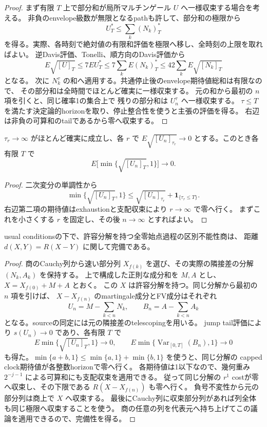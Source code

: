 \begin{proof}
まず有限 $T$ 上で部分和が局所マルチンゲール $U$ へ一様収束する場合を考える。
非負のenvelope級数が無限となるpathも許して、部分和の極限から
\[
 U_T^*\le\sum_k (N_k)_T^*
\]
を得る。実際、各時刻で絶対値の有限和評価を極限へ移し、全時刻の上限を取ればよい。
逆Davis評価、Tonelli、順方向のDavis評価から
\[
 E\sqrt{[U]_T}\le7E U_T^*
 \le7\sum_k E(N_k)_T^*\le42\sum_k E\sqrt{[N_k]_T}
\]
となる。
次に $N_k^\tau$ の和へ適用する。共通停止後のenvelope期待値総和は有限なので、
その部分和は全時間でほとんど確実に一様収束する。
元の和から最初の $n$ 項を引くと、同じ確率1の集合上で
残りの部分和は $U_n^\tau$ へ一様収束する。
$\tau\le T$ を満たす決定論的horizonを取り、停止整合性を使うと主張の評価を得る。
右辺は非負の可算和のtailであるから零へ収束する。
\end{proof}

\begin{lemma}
$\tau_r\to\infty$ がほとんど確実に成立し、各 $r$ で
$E\sqrt{[U_n]_{\tau_r}}\to0$ とする。このとき各有限 $T$ で
\[
 E\bigl[\min\{\sqrt{[U_n]_T},1\}\bigr]\longrightarrow0.
\]
\end{lemma}
\begin{proof}
二次変分の単調性から
\[
 \min\{\sqrt{[U_n]_T},1\}
 \le\sqrt{[U_n]_{\tau_r}}+\boldsymbol1_{\{\tau_r\le T\}}.
\]
右辺第二項の期待値はexhaustionと支配収束により $r\to\infty$ で零へ行く。
まずこれを小さくする $r$ を固定し、その後 $n\to\infty$ とすればよい。
\end{proof}

\begin{theorem}[零始点分解可能過程の補助距離の完備性]
usual conditionsの下で、許容分解を持つ全零始点過程の区別不能性商は、
距離 $d(X,Y)=R(X-Y)$ に関して完備である。
\end{theorem}
\begin{proof}
商のCauchy列から速い部分列 $X_{f(k)}$ を選び、その実際の隣接差の分解 $(N_k,A_k)$ を保持する。
上で構成した正則な成分和を $M,A$ とし、$X=X_{f(0)}+M+A$ とおく。
この $X$ は許容分解を持つ。同じ分解から最初の $n$ 項を引けば、
$X-X_{f(n)}$ のmartingale成分とFV成分はそれぞれ
\[
 U_n=M-\sum_{k<n}N_k,\qquad B_n=A-\sum_{k<n}A_k
\]
となる。sourceの同定には元の隣接差のtelescopingを用いる。
jump tail評価により $s(U_n)\to0$ であり、各有限 $T$ で
\[
 E\min\{\sqrt{[U_n]_T},1\}\to0,\qquad
 E\min\{\operatorname{Var}_{[0,T]}(B_n),1\}\to0
\]
も得た。$\min\{a+b,1\}\le\min\{a,1\}+\min\{b,1\}$ を使うと、同じ分解の
capped clock期待値が各整数horizonで零へ行く。
各期待値は1以下なので、幾何重み $2^{-j-1}$ による可算和にも支配収束を適用できる。
従って同じ分解の $r^1$ costが零へ収束し、その下限である $R(X-X_{f(n)})$ も零へ行く。
負号不変性から元の部分列は商上で $X$ へ収束する。
最後にCauchy列に収束部分列があれば列全体も同じ極限へ収束することを使う。
商の任意の列を代表元へ持ち上げてこの議論を適用できるので、完備性を得る。
\end{proof}

